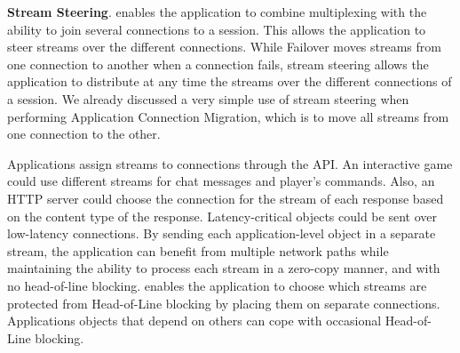 
\textbf{Stream Steering}. \tcpls enables the application to combine
multiplexing with the ability to join
several \tcp connections to a \tcpls session. This allows the application to
steer \tcpls
streams over the different \tcp connections. While Failover moves
\tcpls streams from one connection to another when a \tcp connection fails, stream
steering allows the application to distribute at any time the streams over the
different
\tcp connections of a \tcpls session. We already discussed a very simple use of
stream steering when performing Application Connection Migration, which is to
move all streams from one connection to the other.


Applications assign \tcpls streams to \tcp connections through the \tcpls
API.
An interactive game could use different streams for chat messages and player's
commands.  Also, an HTTP server could choose
the \tcp connection for the stream of each response based on the content type of
the response. Latency-critical objects could be sent over
low-latency connections. By sending each application-level object in a separate
stream, the application can benefit from multiple network paths while
maintaining the ability to process each stream in a zero-copy manner, and
with no head-of-line blocking.
\tcpls enables the application to choose which streams are protected from
Head-of-Line blocking by placing them on separate \tcp connections.
Applications objects that depend on others can cope with occasional
Head-of-Line blocking.

